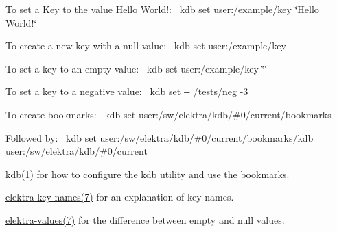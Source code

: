 To set a Key to the value {\ttfamily Hello World!}\+:~\newline
 {\ttfamily kdb set user\+:/example/key \char`\"{}\+Hello World!\char`\"{}}

To create a new key with a null value\+:~\newline
 {\ttfamily kdb set user\+:/example/key}

To set a key to an empty value\+:~\newline
 {\ttfamily kdb set user\+:/example/key \char`\"{}\char`\"{}}

To set a key to a negative value\+:~\newline
 {\ttfamily kdb set -\/-\/ /tests/neg -\/3}

To create bookmarks\+:~\newline
 {\ttfamily kdb set user\+:/sw/elektra/kdb/\#0/current/bookmarks}

Followed by\+:~\newline
 {\ttfamily kdb set user\+:/sw/elektra/kdb/\#0/current/bookmarks/kdb user\+:/sw/elektra/kdb/\#0/current}


\begin{DoxyItemize}
\item \hyperlink{doc_help_kdb_md}{kdb(1)} for how to configure the kdb utility and use the bookmarks.
\item \hyperlink{doc_help_elektra-key-names_md}{elektra-\/key-\/names(7)} for an explanation of key names.
\item \hyperlink{doc_help_elektra-values_md}{elektra-\/values(7)} for the difference between empty and null values. 
\end{DoxyItemize}